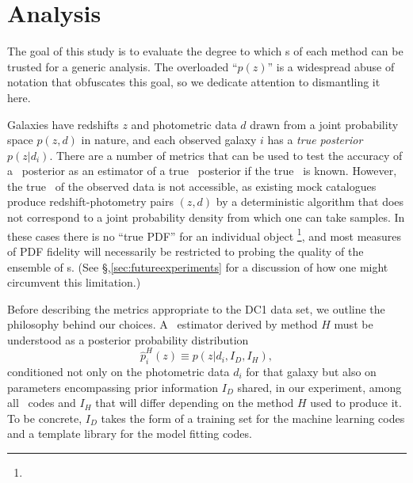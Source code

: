 \section{Analysis}
\label{sec:metrics}

The goal of this study is to evaluate the degree to which \pzpdf s of each method can be trusted for a generic analysis.
The overloaded ``$p(z)$'' is a widespread abuse of notation that obfuscates this goal, so we dedicate attention to dismantling it here.

Galaxies have redshifts $z$ and photometric data $d$ drawn from a joint probability space $p(z, d)$ in nature, and each observed galaxy $i$ has a \textit{true posterior \pzpdf}\ $p(z \vert d_{i})$.
There are a number of metrics that can be used to test the accuracy of a \pz\ posterior as an estimator of a true \pz\ posterior if the true \pzpdf\ is known.
However, the true \pzpdf\ of the observed data is not accessible, as existing mock catalogues produce redshift-photometry pairs $(z, d)$ by a deterministic algorithm that does not correspond to a joint probability density from which one can take samples.
In these cases there is no ``true PDF'' for an individual object
\footnote{}, and most measures of PDF fidelity will necessarily be restricted to probing the quality of the ensemble of \pzpdf s.
(See \S,\ref{sec:futureexperiments} for a discussion of how one might circumvent this limitation.)

Before describing the metrics appropriate to the DC1 data set, we outline the philosophy behind our choices.
A \pzpdf\ estimator derived by method $H$ must be understood as a posterior probability distribution
\begin{equation}
  \label{eq:pzpdf}
\hat{p}^{H}_{i}(z) \equiv p(z \vert d_{i}, I_{D}, I_{H}),
\end{equation}
conditioned not only on the photometric data $d_{i}$ for that galaxy but also on parameters encompassing prior information $I_{D}$ shared, in our experiment, among all \pzpdf\ codes and $I_{H}$ that will differ depending on the method $H$ used to produce it.
To be concrete, $I_{D}$ takes the form of a training set for the machine learning codes and a template library for the model fitting codes.

